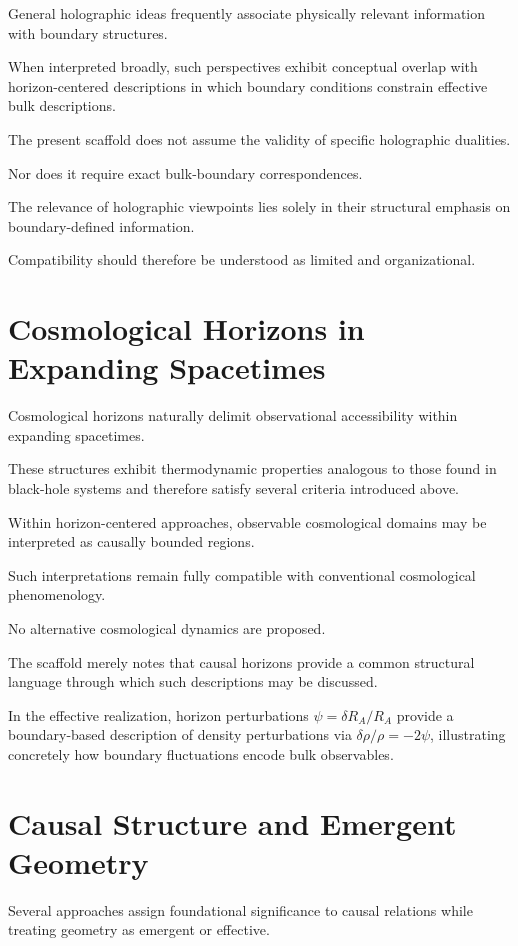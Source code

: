\documentclass[12pt,a4paper]{article}
\begin{document}
General holographic ideas frequently associate physically relevant information with boundary structures.

When interpreted broadly, such perspectives exhibit conceptual overlap with horizon-centered descriptions in which boundary conditions constrain effective bulk descriptions.

The present scaffold does not assume the validity of specific holographic dualities.

Nor does it require exact bulk-boundary correspondences.

The relevance of holographic viewpoints lies solely in their structural emphasis on boundary-defined information.

Compatibility should therefore be understood as limited and organizational.

\section{Cosmological Horizons in Expanding Spacetimes}

Cosmological horizons naturally delimit observational accessibility within expanding spacetimes.

These structures exhibit thermodynamic properties analogous to those found in black-hole systems and therefore satisfy several criteria introduced above.

Within horizon-centered approaches, observable cosmological domains may be interpreted as causally bounded regions.

Such interpretations remain fully compatible with conventional cosmological phenomenology.

No alternative cosmological dynamics are proposed.

The scaffold merely notes that causal horizons provide a common structural language through which such descriptions may be discussed.

In the effective realization, horizon perturbations $\psi = \delta R_A / R_A$ provide a boundary-based description of density perturbations via $\delta\rho/\rho = -2\psi$, illustrating concretely how boundary fluctuations encode bulk observables.

\section{Causal Structure and Emergent Geometry}

Several approaches assign foundational significance to causal relations while treating geometry as emergent or effective.
\end{document}
